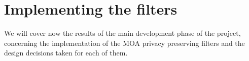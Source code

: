 \chapter{Implementing the filters} %
\label{Chapter6ImplementingFilters} %


We will cover now the results of the main development phase of the project, concerning the implementation of the MOA privacy preserving filters and the design decisions taken for each of them.







